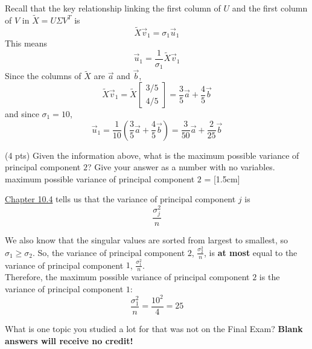 \documentclass[11pt]{article}
\begin{document}
\begin{prob}[(12 pts)]
\begin{subprob}
\begin{solution}
Recall that the key relationship linking the first column of $U$ and the first column of $V$ in $\tilde X = U \Sigma V^T$ is
\[
\tilde{X}\vec{v}_1=\sigma_1\vec{u}_1
\]
This means
\[
\vec{u}_1=\frac{1}{\sigma_1}\tilde{X}\vec{v}_1
\]
Since the columns of $\tilde{X}$ are $\vec{a}$ and $\vec{b}$,
\[
\tilde{X}\vec{v}_1
=
\tilde{X}\begin{bmatrix}3/5\\4/5\end{bmatrix}
=
\frac{3}{5}\vec{a}+\frac{4}{5}\vec{b}
\]
and since $\sigma_1=10$,
\[
\vec{u}_1
=
\frac{1}{10}\left(\frac{3}{5}\vec{a}+\frac{4}{5}\vec{b}\right)
=
\frac{3}{50}\vec{a}+\frac{2}{25}\vec{b}
\]
\end{solution}

\end{subprob}
\begin{subprob}(4 pts) Given the information above, what is the maximum possible variance of principal component $2$? Give your answer as a number with no variables. \\

maximum possible variance of principal component $2$ = [1.5cm]

\begin{solution}
\href{https://notes.eecs245.org/singular-value-decomposition/principal-components-analysis/}{Chapter 10.4} tells us that the variance of principal component $j$ is
\[
\frac{\sigma_j^2}{n}
\]

We also know that the singular values are sorted from largest to smallest, so $\sigma_1 \geq \sigma_2$. So, the variance of principal component $2$, $\frac{\sigma_2^2}{n}$, is \textbf{at most} equal to the variance of principal component $1$, $\frac{\sigma_1^2}{n}$. \\

Therefore, the maximum possible variance of principal component $2$ is the variance of principal component $1$:
\[
\frac{\sigma_1^2}{n}=\frac{10^2}{4}=25
\]
\end{solution}
\end{subprob}

\end{prob}

\newpage

\begin{prob}[(4 pts)]
What is one topic you studied a lot for that was not on the Final Exam? \textbf{Blank answers will receive no credit!}

\emptybox{4cm}
\end{prob}
\end{document}
